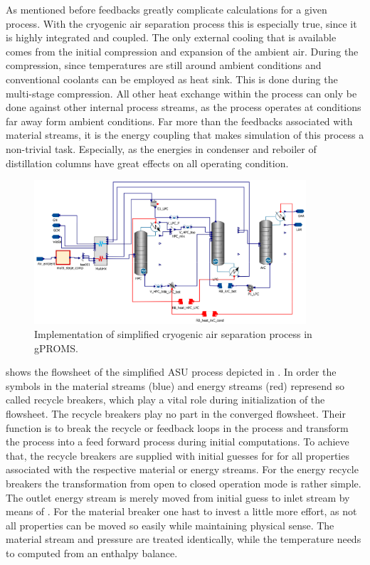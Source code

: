         As mentioned before feedbacks greatly complicate calculations for a given process. With the cryogenic air separation
        process this is especially true, since it is highly integrated and coupled. The only external cooling that is available
        comes from the initial compression and expansion of the ambient air. During the compression, since temperatures are
        still around ambient conditions and conventional coolants can be employed as heat sink. This is done during the
        multi-stage compression. All other heat exchange within the process can only be done against other internal process
        streams, as the process operates at conditions far away form ambient conditions. Far more than the feedbacks associated
        with material streams, it is the energy coupling that makes simulation of this process a non-trivial task. Especially, as
        the energies in condenser and reboiler of distillation columns have great effects on all operating condition.

        \begin{figure}
            \centering
            \includegraphics[width=0.9\textwidth]{Pictures/ASU_simple_gPROMS.eps}
            \caption{Implementation of simplified cryogenic air separation process in gPROMS.}
            \label{fig:ASU_simple_gproms}
        \end{figure}

         shows the flowsheet of the simplified ASU process depicted in .
        In order the symbols in the material streams (blue) and energy streams (red) represend so called recycle breakers, which
        play a vital role during initialization of the flowsheet. The recycle breakers play no part in the converged flowsheet.
        Their function is to break the recycle or feedback loops in the process and transform the process into a feed forward process
        during initial computations. To achieve that, the recycle breakers are supplied with initial guesses for for all properties
        associated with the respective material or energy streams. For the energy recycle breakers the transformation from open to
        closed operation mode is rather simple. The outlet energy stream is merely moved from initial guess to inlet stream by
        means of . For the material breaker one hast to invest a little more effort, as not all properties can be
        moved so easily while maintaining physical sense. The material stream and pressure are treated identically, while the temperature
        needs to computed from an enthalpy balance.

